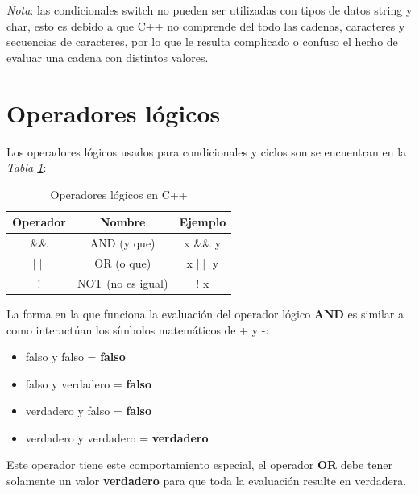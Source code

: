\textit{Nota}: las condicionales switch no pueden ser utilizadas con tipos de datos string y char, esto es debido a que C++ no comprende del todo las cadenas, caracteres y secuencias de caracteres, por lo que le resulta complicado o confuso el hecho de evaluar una cadena con distintos valores.



\section{Operadores lógicos}
\hspace{0.55cm}Los operadores lógicos usados para condicionales y ciclos son se encuentran en la \textit{Tabla \ref{tab: 6}}:
\begin{table}[H]
    \begin{center}
        \caption{Operadores lógicos en C++}
        \label{tab: 6}
        \begin{tabular}{c c c}
            \hline
            \textbf{Operador} & \textbf{Nombre} & \textbf{Ejemplo} \\
            \hline
            \&\&			& AND (y que)		& x \&\& y \\
            $\mid\mid$	& OR (o que)			& x $\mid\mid$ y \\
            !			& NOT (no es igual)	& ! x \\
            \hline
        \end{tabular}
    \end{center}
\end{table}

La forma en la que funciona la evaluación del operador lógico \textbf{AND} es similar a como interactúan los símbolos matemáticos de + y -:
\begin{itemize}
    \item falso y falso = \textbf{falso}
    \item falso y verdadero = \textbf{falso}
    \item verdadero y falso = \textbf{falso}
    \item verdadero y verdadero = \textbf{verdadero}
\end{itemize}

Este operador tiene este comportamiento especial, el operador \textbf{OR} debe tener solamente un valor \textbf{verdadero} para que toda la evaluación resulte en verdadera.


